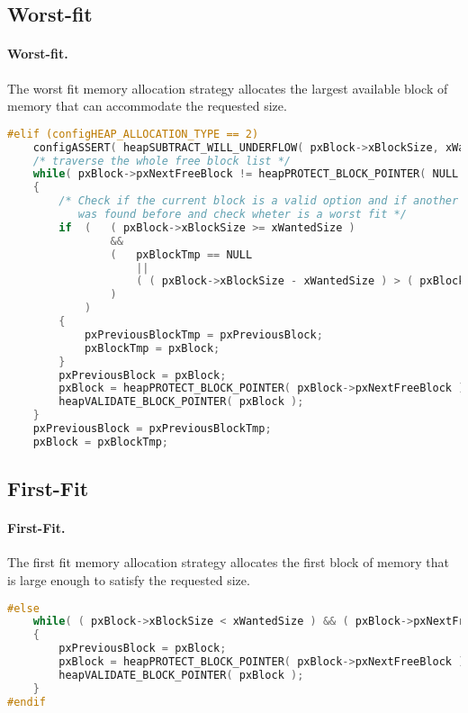 \subsection{Worst-fit}
\paragraph{Worst-fit.} The worst fit memory allocation strategy allocates the largest available block of memory that can accommodate the requested size.
\begin{lstlisting}[language=C,caption={Custom implementation of Worst-Fit algorithm added to heap\_4.c}]
#elif (configHEAP_ALLOCATION_TYPE == 2)
    configASSERT( heapSUBTRACT_WILL_UNDERFLOW( pxBlock->xBlockSize, xWantedSize ) == 0 );
    /* traverse the whole free block list */
    while( pxBlock->pxNextFreeBlock != heapPROTECT_BLOCK_POINTER( NULL ) )
    {
        /* Check if the current block is a valid option and if another valid block
           was found before and check wheter is a worst fit */
        if  (   ( pxBlock->xBlockSize >= xWantedSize )
                &&
                (   pxBlockTmp == NULL
                    ||
                    ( ( pxBlock->xBlockSize - xWantedSize ) > ( pxBlockTmp->xBlockSize - xWantedSize ) )
                )
            )
        {
            pxPreviousBlockTmp = pxPreviousBlock;
            pxBlockTmp = pxBlock;
        }
        pxPreviousBlock = pxBlock;
        pxBlock = heapPROTECT_BLOCK_POINTER( pxBlock->pxNextFreeBlock );
        heapVALIDATE_BLOCK_POINTER( pxBlock );
    }
    pxPreviousBlock = pxPreviousBlockTmp;
    pxBlock = pxBlockTmp;
\end{lstlisting}

\subsection{First-Fit}
\paragraph{First-Fit.}The first fit memory allocation strategy allocates the first block of memory that is large enough to satisfy the requested size.

\begin{lstlisting}[language=C,caption={Default implementation of First-fit algorithm}]
#else
    while( ( pxBlock->xBlockSize < xWantedSize ) && ( pxBlock->pxNextFreeBlock != heapPROTECT_BLOCK_POINTER( NULL ) ) )
    {
        pxPreviousBlock = pxBlock;
        pxBlock = heapPROTECT_BLOCK_POINTER( pxBlock->pxNextFreeBlock );
        heapVALIDATE_BLOCK_POINTER( pxBlock );
    }
#endif
\end{lstlisting}
